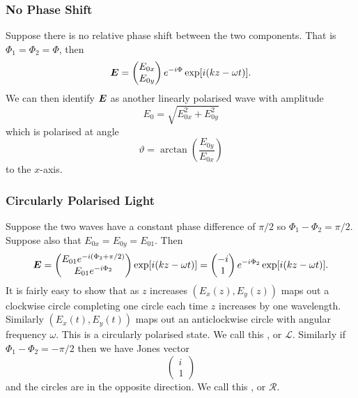     \subsubsection{No Phase Shift}
    Suppose there is no relative phase shift between the two components.
    That is \(\Phi_1 = \Phi_2 = \Phi\), then
    \[
        \bm{E} = 
        \begin{pmatrix}
            E_{0x}\\ E_{0y}
        \end{pmatrix}
        e^{-i\Phi}\exp[i(kz - \omega t)].
    \]
    We can then identify \(\bm{E}\) as another linearly polarised wave with amplitude
    \[E_{0} = \sqrt{E_{0x}^2 + E_{0y}^2}\]
    which is polarised at angle
    \[\vartheta = \arctan\left( \frac{E_{0y}}{E_{0x}} \right)\]
    to the \(x\)-axis.
    
    \subsubsection{Circularly Polarised Light}
    Suppose the two waves have a constant phase difference of \(\pi/2\) so \(\Phi_1 - \Phi_2 = \pi/2\).
    Suppose also that \(E_{0x} = E_{0y} = E_{01}\).
    Then
    \[
        \bm{E} = 
        \begin{pmatrix}
            E_{01}e^{-i(\Phi_2 + \pi/2)}\\
            E_{01}e^{-i\Phi_2}
        \end{pmatrix}
        \exp[i(kz - \omega t)] = 
        \begin{pmatrix}
            -i\\ 1
        \end{pmatrix}
        e^{-i\Phi_2}\exp[i(kz - \omega t)].
    \]
    It is fairly easy to show that as \(z\) increases \((E_x(z), E_y(z))\) maps out a clockwise circle completing one circle each time \(z\) increases by one wavelength.
    Similarly \((E_x(t), E_y(t))\) maps out an anticlockwise circle with angular frequency \(\omega\).
    This is a circularly polarised state.
    We call this , or \(\mathcal{L}\).
    Similarly if \(\Phi_1 - \Phi_2 = -\pi/2\) then we have Jones vector
    \[
        \begin{pmatrix}
            i\\ 1
        \end{pmatrix}
    \]
    and the circles are in the opposite direction.
    We call this , or \(\mathcal{R}\).
    
